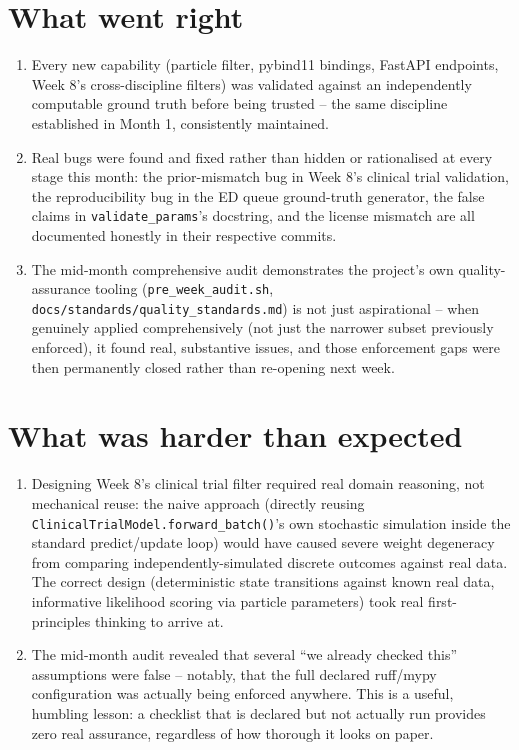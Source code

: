\documentclass[11pt]{article}
\begin{document}
\section*{What went right}
\begin{enumerate}[leftmargin=*]
  \item Every new capability (particle filter, pybind11 bindings,
    FastAPI endpoints, Week 8's cross-discipline filters) was
    validated against an independently computable ground truth before
    being trusted -- the same discipline established in Month 1,
    consistently maintained.
  \item Real bugs were found and fixed rather than hidden or
    rationalised at every stage this month: the prior-mismatch bug in
    Week 8's clinical trial validation, the reproducibility bug in the
    ED queue ground-truth generator, the false claims in
    \texttt{validate\_params}'s docstring, and the license mismatch
    are all documented honestly in their respective commits.
  \item The mid-month comprehensive audit demonstrates the project's
    own quality-assurance tooling (\texttt{pre\_week\_audit.sh},
    \texttt{docs/standards/quality\_standards.md}) is not just
    aspirational -- when genuinely applied comprehensively (not just
    the narrower subset previously enforced), it found real,
    substantive issues, and those enforcement gaps were then
    permanently closed rather than re-opening next week.
\end{enumerate}

\section*{What was harder than expected}
\begin{enumerate}[leftmargin=*]
  \item Designing Week 8's clinical trial filter required real
    domain reasoning, not mechanical reuse: the naive approach
    (directly reusing \texttt{ClinicalTrialModel.forward\_batch()}'s
    own stochastic simulation inside the standard predict/update loop)
    would have caused severe weight degeneracy from comparing
    independently-simulated discrete outcomes against real data. The
    correct design (deterministic state transitions against known
    real data, informative likelihood scoring via particle
    parameters) took real first-principles thinking to arrive at.
  \item The mid-month audit revealed that several ``we already
    checked this'' assumptions were false -- notably, that the full
    declared ruff/mypy configuration was actually being enforced
    anywhere. This is a useful, humbling lesson: a checklist that is
    declared but not actually run provides zero real assurance,
    regardless of how thorough it looks on paper.
\end{enumerate}
\end{document}
